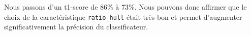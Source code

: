 Nous passons d'un t1-score de 86\% à 73\%. Nous pouvons donc affirmer que le choix de la caractéristique \texttt{ratio\_hull} était très bon et permet d'augmenter significativement la précision du classificateur.





